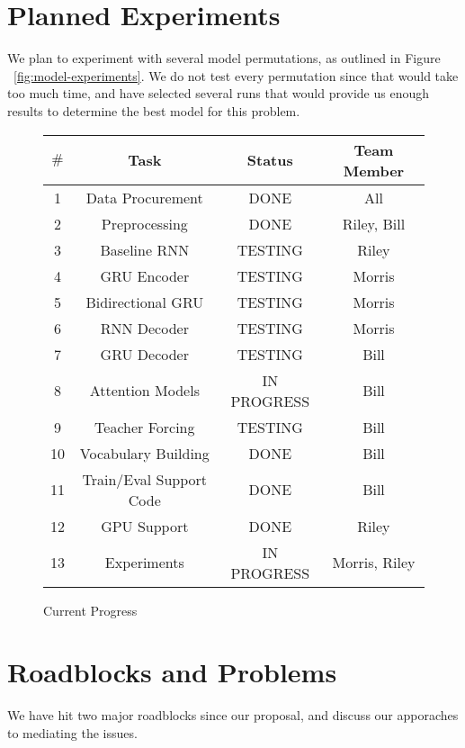 \documentclass[twoside,twocolumn]{article}
\begin{document}
\section{Planned Experiments}
We plan to experiment with several model permutations, as outlined in Figure
~\ref{fig:model-experiments}. We do not test every permutation since that would
take too much time, and have selected several runs that would provide us enough
results to determine the best model for this problem.

\begin{figure*}[ht]
    \centering
    \begin{tabular}{ |c|c|c|c| }
        \hline
        $\#$
          & \textbf{Task}
          & \textbf{Status}
          & \textbf{Team Member}\\
        \hline
        1 & Data Procurement & DONE & All \\ \hline
        2 & Preprocessing & DONE & Riley, Bill \\ \hline
        3 & Baseline RNN & TESTING & Riley \\ \hline
        4 & GRU Encoder & TESTING & Morris \\ \hline
        5 & Bidirectional GRU & TESTING & Morris \\ \hline
        6 & RNN Decoder & TESTING & Morris \\ \hline
        7 & GRU Decoder & TESTING & Bill \\ \hline
        8 & Attention Models & IN PROGRESS & Bill \\ \hline
        9 & Teacher Forcing & TESTING & Bill \\ \hline
        10 & Vocabulary Building & DONE & Bill \\ \hline
        11 & Train/Eval Support Code & DONE & Bill \\ \hline
        12 & GPU Support & DONE & Riley \\ \hline
        13 & Experiments & IN PROGRESS & Morris, Riley \\ \hline
    \end{tabular}

    \caption{Current Progress}
    \label{fig:current-status}
\end{figure*}


\section{Roadblocks and Problems}
We have hit two major roadblocks since our proposal, and discuss our apporaches
to mediating the issues.
\end{document}
